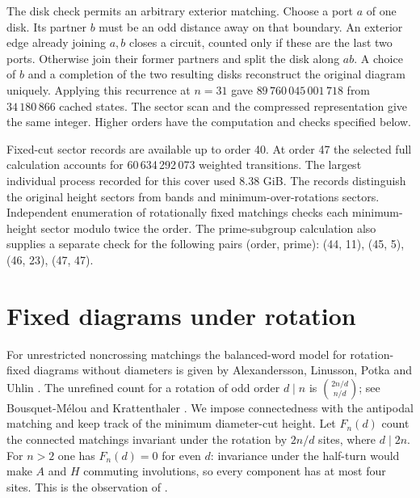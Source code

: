 The disk check permits an arbitrary exterior matching. Choose a port \(a\) of one disk. Its partner \(b\) must be an odd distance away on that boundary. An exterior edge already joining \(a,b\) closes a circuit, counted only if these are the last two ports. Otherwise join their former partners and split the disk along \(ab\). A choice of \(b\) and a completion of the two resulting disks reconstruct the original diagram uniquely. Applying this recurrence at \(n=31\) gave \(89\,760\,045\,001\,718\) from \(34\,180\,866\) cached states. The sector scan and the compressed representation give the same integer. Higher orders have the computation and checks specified below.

Fixed-cut sector records are available up to order 40. At order 47 the selected full calculation accounts for 60\,634\,292\,073 weighted transitions. The largest individual process recorded for this cover used 8.38 GiB. The records distinguish the original height sectors from bands and minimum-over-rotations sectors. Independent enumeration of rotationally fixed matchings checks each minimum-height sector modulo twice the order. The prime-subgroup calculation also supplies a separate check for the following pairs (order, prime): (44, 11), (45, 5), (46, 23), (47, 47).

\section{Fixed diagrams under rotation}
For unrestricted noncrossing matchings the balanced-word model for
rotation-fixed diagrams without diameters is given by Alexandersson,
Linusson, Potka and Uhlin \cite[Appendix B.1, Bijection 5]{alpu}.
The unrefined count for a rotation of odd order \(d\mid n\) is
\(\binom{2n/d}{n/d}\); see Bousquet-M\'elou and Krattenthaler
\cite[Corollary 26]{bmk}. We impose connectedness with the antipodal
matching and keep track of the minimum diameter-cut height.
Let \(F_n(d)\) count the connected matchings invariant under the rotation by \(2n/d\) sites, where \(d\mid2n\). For \(n>2\) one has \(F_n(d)=0\) for even \(d\): invariance under the half-turn would make \(A\) and \(H\) commuting involutions, so every component has at most four sites. This is the observation of \cite[Lemma~2.3]{lz}.


